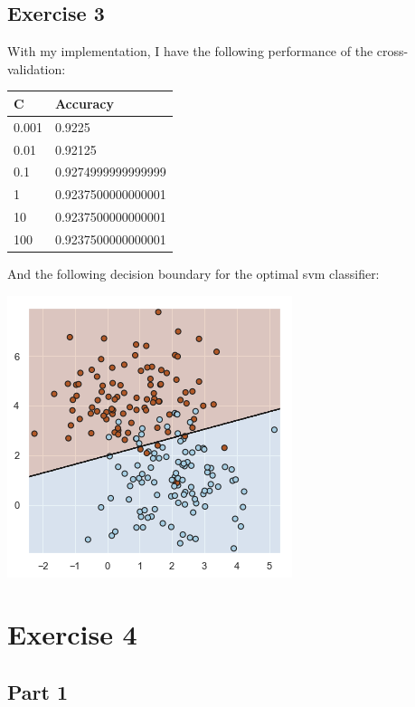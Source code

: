 \documentclass{report}
\begin{document}
\subsection*{Exercise 3}
With my implementation, I have the following performance of the cross-validation:
\begin{center}
    \begin{tabular}{|l|l|}
        \hline
        C & Accuracy \\
        \hline
        0.001 & 0.9225 \\
        \hline
        0.01 & 0.92125 \\
        \hline
        0.1 & 0.9274999999999999 \\
        \hline
        1 & 0.9237500000000001 \\
        \hline
        10 & 0.9237500000000001 \\
        \hline
        100 & 0.9237500000000001 \\
        \hline
    \end{tabular}
\end{center}
And the following decision boundary for the optimal svm classifier:
\begin{center}
    \includegraphics[height = 7 cm]{3_decision_boundary.png}
\end{center}

\section*{Exercise 4}
\subsection*{Part 1}
\end{document}
